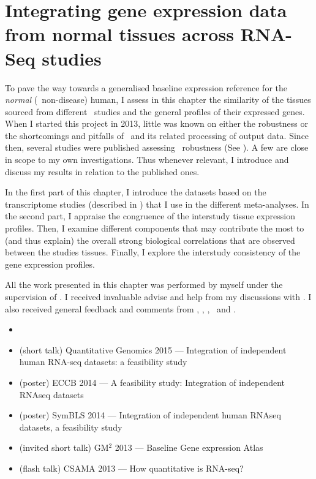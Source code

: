 \chapter{Integrating gene expression data from normal tissues across RNA-Seq studies}%
\label{ch:Transcriptomics}

\setlength{\epigraphwidth}{0.54\textwidth}
\setlength{\epigraphrule}{0pt}


\vspace*{0.7in}

To pave the way towards
a generalised baseline expression reference for the \emph{normal}
(\ie\ non-disease) human,
I assess in this chapter the similarity
of the tissues sourced from different \Rnaseq\ studies and
the general profiles of their expressed genes.
When I started this project in 2013,
little was known on either the robustness or
the shortcomings and pitfalls of \Rnaseq\ and
its related processing of output data.
Since then, several studies were published assessing \Rnaseq\
robustness (See ).
A few are close in scope to my own investigations.
Thus whenever relevant,
I introduce and discuss my results in relation to the published ones.\mybr\

In the first part of this chapter,
I introduce the datasets based on the transcriptome studies
(described in ) that I use in the different meta-analyses.
In the second part,
I appraise the congruence of the interstudy tissue expression profiles.
Then, I examine different components that may contribute
the most to (and thus explain)
the overall strong biological correlations that are observed
between the studies tissues.
Finally, I explore the interstudy consistency of the gene expression profiles.\mybr\

All the work presented in this chapter was performed by myself under the
supervision of \alvis.
I received invaluable advise and help from my discussions with \nuno.
I also received general feedback and comments from \mar, \johan, \sarah, \gos\
and \wolfgang.\mybr\
\clearpage

\derivativeWork{}
\begin{itemize}[topsep=0pt,nosep]
    \item\hspace{-1.8mm}
    \item (short talk) Quantitative Genomics 2015 --- Integration of
        independent human RNA-seq datasets: a feasibility study
    \item (poster) ECCB 2014 --- A feasibility study:
        Integration of independent RNAseq datasets
    \item (poster) SymBLS 2014 --- Integration of independent human
        RNAseq datasets, a feasibility study
    \item (invited short talk) GM$^2$ 2013 --- Baseline Gene expression Atlas
    \item (flash talk) CSAMA 2013 --- How quantitative is RNA-seq?
\end{itemize}
\clearpage

